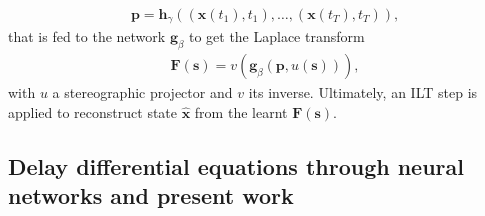 %
\begin{equation}
\begin{aligned}
& \mathbf{p} = \mathbf{h}_{\gamma}((\mathbf{x}(t_1), t_1), \dots, (\mathbf{x}(t_T), t_T)),
\end{aligned}
\end{equation}
%
that is fed to the network $\mathbf{g}_{\beta}$ to get the Laplace transform 
%
\begin{equation}
\begin{aligned}
& \mathbf{F}(\mathbf{s}) = v\left( \mathbf{g}_{\beta}(\mathbf{p}, u(\mathbf{s})) \right),
\end{aligned}
\end{equation}
%
with $u$ a stereographic projector and $v$ its inverse. Ultimately, an ILT step is applied to reconstruct state $\widehat{\mathbf{x}}$ from the learnt $\mathbf{F}(\mathbf{s})$. 


\subsection{Delay differential equations through neural networks and present work} 

